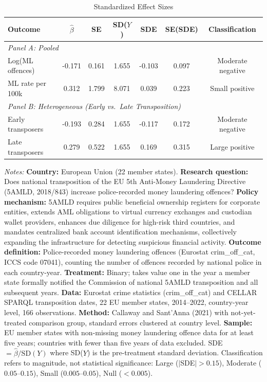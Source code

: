 \begin{table}[htbp]
\centering
\caption{Standardized Effect Sizes}
\label{tab:sde}
\begin{threeparttable}
\begin{tabular}{lcccccc}
\toprule
Outcome & $\hat{\beta}$ & SE & SD($Y$) & SDE & SE(SDE) & Classification \\
\midrule
\multicolumn{7}{l}{\textit{Panel A: Pooled}} \\
Log(ML offences) & -0.171 & 0.161 & 1.655 & -0.103 & 0.097 & Moderate negative \\
ML rate per 100k & 0.312 & 1.799 & 8.071 & 0.039 & 0.223 & Small positive \\
\midrule
\multicolumn{7}{l}{\textit{Panel B: Heterogeneous (Early vs.\ Late Transposition)}} \\
Early transposers & -0.193 & 0.284 & 1.655 & -0.117 & 0.172 & Moderate negative \\
Late transposers & 0.279 & 0.522 & 1.655 & 0.169 & 0.315 & Large positive \\
\bottomrule
\end{tabular}
\begin{tablenotes}[flushleft]\small
\item \textit{Notes:} \textbf{Country:} European Union (22 member states). \textbf{Research question:} Does national transposition of the EU 5th Anti-Money Laundering Directive (5AMLD, 2018/843) increase police-recorded money laundering offences? \textbf{Policy mechanism:} 5AMLD requires public beneficial ownership registers for corporate entities, extends AML obligations to virtual currency exchanges and custodian wallet providers, enhances due diligence for high-risk third countries, and mandates centralized bank account identification mechanisms, collectively expanding the infrastructure for detecting suspicious financial activity. \textbf{Outcome definition:} Police-recorded money laundering offences (Eurostat crim\_off\_cat, ICCS code 07041), counting the number of offences recorded by national police in each country-year. \textbf{Treatment:} Binary; takes value one in the year a member state formally notified the Commission of national 5AMLD transposition and all subsequent years. \textbf{Data:} Eurostat crime statistics (crim\_off\_cat) and CELLAR SPARQL transposition dates, 22 EU member states, 2014--2022, country-year level, 166 observations. \textbf{Method:} Callaway and Sant'Anna (2021) with not-yet-treated comparison group, standard errors clustered at country level. \textbf{Sample:} EU member states with non-missing money laundering offence data for at least five years; countries with fewer than five years of data excluded. SDE $= \hat{\beta} / \text{SD}(Y)$ where SD($Y$) is the pre-treatment standard deviation. Classification refers to magnitude, not statistical significance: Large ($|$SDE$| > 0.15$), Moderate ($0.05$--$0.15$), Small ($0.005$--$0.05$), Null ($< 0.005$).
\end{tablenotes}
\end{threeparttable}
\end{table}
